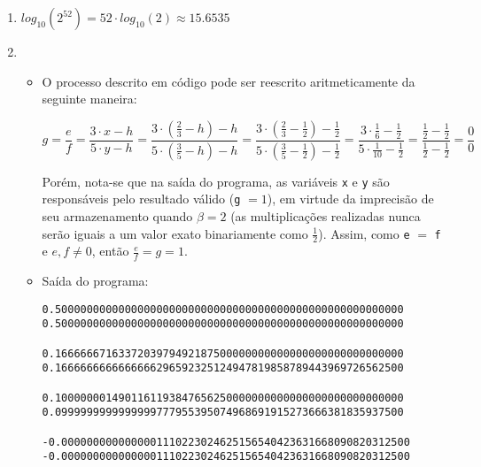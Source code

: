 \documentclass{article}
\newenvironment{arabenum}{
    \begin{enumerate}[label=\textbf{\arabic*})]
}{
    \end{enumerate}
}
\newenvironment{discusscode}[1]{
    
    \vspace{-2mm}
    \begin{itemize}
}{
    \end{itemize}
}
\begin{document}
\begin{arabenum}
\begin{verbatim}
>>> 2**(-1022 - 52)
5e-324
>>> 2**(-1022)
2.2250738585072014e-308
>>> (2 - 2**(-52)) * (2**1023)
1.7976931348623157e+308
>>> float(2**1024)
Traceback (most recent call last):
  File "<stdin>", line 1, in <module>
OverflowError: int too large to convert to float
\end{verbatim}

\item $log_{10} (2^{52}) = 52 \cdot log_{10} (2) \approx \boldsymbol{15.6535}$

\item \begin{discusscode}{div_by_zero.py}

\item O processo descrito em código pode ser reescrito aritmeticamente da
seguinte maneira:

\begin{equation*}
g = \frac{e}{f}
  = \frac{3 \cdot x - h}{5 \cdot y - h}
  = \frac{3 \cdot (\frac{2}{3} - h) - h}{5 \cdot (\frac{3}{5} - h) - h}
  = \frac{3 \cdot (\frac{2}{3} - \frac{1}{2}) - \frac{1}{2}}
         {5 \cdot (\frac{3}{5} - \frac{1}{2}) - \frac{1}{2}}
  = \frac{3 \cdot \frac{1}{6} - \frac{1}{2}}
         {5 \cdot \frac{1}{10} - \frac{1}{2}}
  = \frac{\frac{1}{2} - \frac{1}{2}}{\frac{1}{2} - \frac{1}{2}}
  = \frac{0}{0}
\end{equation*}

Porém, nota-se que na saída do programa, as variáveis \verb!x! e \verb!y! são
responsáveis pelo resultado válido (\verb!g! $= 1$), em virtude da imprecisão de
seu armazenamento quando $\beta = 2$ (as multiplicações realizadas nunca serão
iguais a um valor exato binariamente como $\frac{1}{2}$). Assim, como \verb!e!
$=$ \verb!f! e $e,f \neq 0$, então $\frac{e}{f} = g = 1$.

\item Saída do programa:
\begin{verbatim}
0.5000000000000000000000000000000000000000000000000000000
0.5000000000000000000000000000000000000000000000000000000

0.1666666716337203979492187500000000000000000000000000000
0.1666666666666666296592325124947819858789443969726562500

0.1000000014901161193847656250000000000000000000000000000
0.0999999999999999777955395074968691915273666381835937500

-0.0000000000000001110223024625156540423631668090820312500
-0.0000000000000001110223024625156540423631668090820312500


\end{verbatim}
\end{discusscode}
\end{arabenum}
\end{document}
